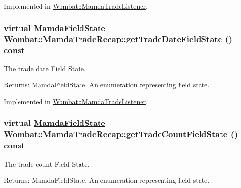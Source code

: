 Implemented in \hyperlink{classWombat_1_1MamdaTradeListener_c5bf736fa985c2ee23694b11235e5933}{Wombat::Mamda\-Trade\-Listener}.\hypertarget{classWombat_1_1MamdaTradeRecap_825b27f46b43bbe98dacb9377b32e0e3}{
\subsubsection[getTradeDateFieldState]{\setlength{\rightskip}{0pt plus 5cm}virtual \hyperlink{namespaceWombat_93aac974f2ab713554fd12a1fa3b7d2a}{Mamda\-Field\-State} Wombat::Mamda\-Trade\-Recap::get\-Trade\-Date\-Field\-State () const}}
\label{classWombat_1_1MamdaTradeRecap_825b27f46b43bbe98dacb9377b32e0e3}


The trade date Field State. 

\begin{Desc}
\item[Returns:]Mamda\-Field\-State. An enumeration representing field state. \end{Desc}


Implemented in \hyperlink{classWombat_1_1MamdaTradeListener_6ce7a7bba0ea6365f5e5fa3901ae7701}{Wombat::Mamda\-Trade\-Listener}.\hypertarget{classWombat_1_1MamdaTradeRecap_6de11a97ec493b1e7fd9c843406127bc}{
\subsubsection[getTradeCountFieldState]{\setlength{\rightskip}{0pt plus 5cm}virtual \hyperlink{namespaceWombat_93aac974f2ab713554fd12a1fa3b7d2a}{Mamda\-Field\-State} Wombat::Mamda\-Trade\-Recap::get\-Trade\-Count\-Field\-State () const}}
\label{classWombat_1_1MamdaTradeRecap_6de11a97ec493b1e7fd9c843406127bc}


The trade count Field State. 

\begin{Desc}
\item[Returns:]Mamda\-Field\-State. An enumeration representing field state. \end{Desc}


